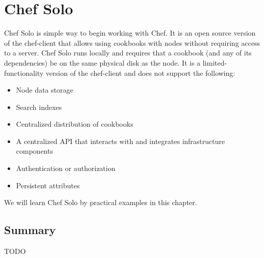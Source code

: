 \chapter{Chef Solo}

Chef Solo is simple way to begin working with Chef. It is an open source version of the chef-client that allows using cookbooks with nodes without requiring access to a server. Chef Solo runs locally and requires that a cookbook (and any of its dependencies) be on the same physical disk as the node. It is a limited-functionality version of the chef-client and does not support the following:

\begin{itemize}
  \item Node data storage
  \item Search indexes
  \item Centralized distribution of cookbooks
  \item A centralized API that interacts with and integrates infrastructure components
  \item Authentication or authorization
  \item Persistent attributes
\end{itemize}

We will learn Chef Solo by practical examples in this chapter.












\section{Summary}

TODO